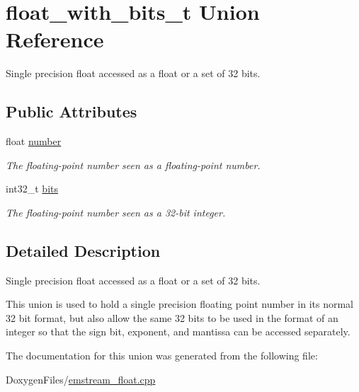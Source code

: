 \hypertarget{unionfloat__with__bits__t}{}\section{float\+\_\+with\+\_\+bits\+\_\+t Union Reference}
\label{unionfloat__with__bits__t}


Single precision float accessed as a float or a set of 32 bits.  


\subsection*{Public Attributes}
\begin{DoxyCompactItemize}
\item 
\mbox{\label{unionfloat__with__bits__t_a618de56b5362fe1c3e380b0d588a8910}} 
float \mbox{\hyperlink{unionfloat__with__bits__t_a618de56b5362fe1c3e380b0d588a8910}{number}}
\begin{DoxyCompactList}\small\item\em The floating-\/point number seen as a floating-\/point number. \end{DoxyCompactList}\item 
\mbox{\label{unionfloat__with__bits__t_ae9649f9cee68a274f87d01f42143f92b}} 
int32\+\_\+t \mbox{\hyperlink{unionfloat__with__bits__t_ae9649f9cee68a274f87d01f42143f92b}{bits}}
\begin{DoxyCompactList}\small\item\em The floating-\/point number seen as a 32-\/bit integer. \end{DoxyCompactList}\end{DoxyCompactItemize}


\subsection{Detailed Description}
Single precision float accessed as a float or a set of 32 bits. 

This union is used to hold a single precision floating point number in its normal 32 bit format, but also allow the same 32 bits to be used in the format of an integer so that the sign bit, exponent, and mantissa can be accessed separately. 

The documentation for this union was generated from the following file\+:\begin{DoxyCompactItemize}
\item 
Doxygen\+Files/\mbox{\hyperlink{emstream__float_8cpp}{emstream\+\_\+float.\+cpp}}\end{DoxyCompactItemize}

